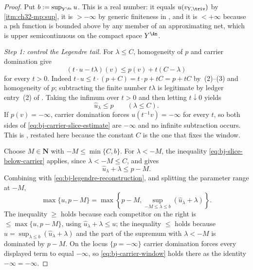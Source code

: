 \begin{proof}
Put $b:=\sup_{Y^{\An}}u$.  This is a real number: it equals
$u(v_{Y,\triv})$ by
\,\cref{itm:ch32-mp:sup}, it is
$>-\infty$ by generic finiteness in , and it is
$<+\infty$ because a psh function is bounded above by any member of an
approximating net, which is upper semicontinuous on the compact space
$Y^{\An}$.

\medskip
\noindent\emph{Step 1: control the Legendre tail.}
For $\lambda\le C$, homogeneity of $p$ and carrier domination give
\[
 (t\mathbin\cdot u-t\lambda)(v)
 \le p(v)+t(C-\lambda)
\tag{39.39}\label{eq:bj-carrier-slice-estimate}
\]
for every $t>0$.  Indeed $t\cdot u\le t\cdot(p+C)=t\cdot p+tC=p+tC$ by
\,(2)--(3) and homogeneity of $p$; subtracting
the finite number $t\lambda$ is legitimate by ledger entry~(2) of
.  Taking the infimum over $t>0$ and then
letting $t\downarrow0$ yields
\[
                         \widehat u_\lambda\le p
                         \qquad(\lambda\le C).
\tag{39.40}\label{eq:bj-slice-below-carrier}
\]
If $p(v)=-\infty$, carrier domination forces
$u(t^{-1}v)=-\infty$ for every $t$, so both sides of
\eqref{eq:bj-carrier-slice-estimate} are $-\infty$ and no infinite
subtraction occurs.  This is , restated here
because the constant $C$ is the one that fixes the window.

Choose $M\in\mathbf N$ with $-M\le\min\{C,b\}$.  For $\lambda<-M$, the
inequality \eqref{eq:bj-slice-below-carrier} applies, since
$\lambda<-M\le C$, and gives
\[
                         \widehat u_\lambda+\lambda\le p-M .
\]
Combining with \eqref{eq:bj-legendre-reconstruction}, and splitting the
parameter range at $-M$,
\[
 \max\{u,p-M\}
 =\max\left\{p-M,
   \sup_{-M\le\lambda\le b}
        (\widehat u_\lambda+\lambda)\right\}.
\tag{39.41}\label{eq:bj-carrier-window}
\]
The inequality $\ge$ holds because each competitor on the right is
$\le\max\{u,p-M\}$, using $\widehat u_\lambda+\lambda\le u$; the
inequality $\le$ holds because
$u=\sup_{\lambda\le b}(\widehat u_\lambda+\lambda)$ and the part of the
supremum with $\lambda<-M$ is dominated by $p-M$.  On the locus
$\{p=-\infty\}$ carrier domination forces every displayed term to equal
$-\infty$, so \eqref{eq:bj-carrier-window} holds there as the identity
$-\infty=-\infty$.


\end{proof}
